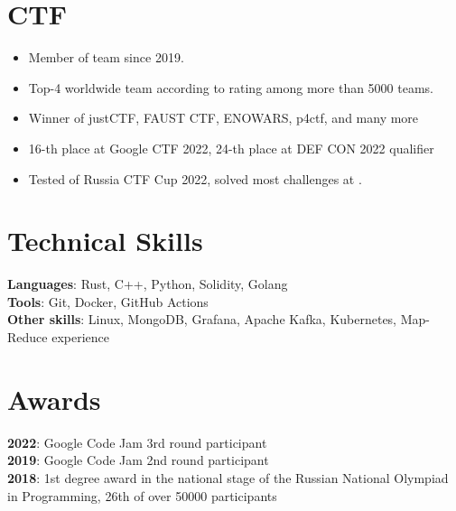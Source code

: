 \documentclass[letterpaper,11pt]{article}
\begin{document}
\section {CTF}
\begin{itemize}[leftmargin=0.15in]
  \setlength\itemsep{-5px}
  \item Member of \href{https://ctftime.org/team/83435}{\color{blue}{C4T BuT S4D}} team since 2019.
  \item Top-4 worldwide team according to \href{https://ctftime.org}{\color{blue}{ctftime}} rating among more than 5000 teams.
  \item Winner of justCTF, FAUST CTF, ENOWARS, p4ctf, and many more
  \item 16-th place at Google CTF 2022, 24-th place at DEF CON 2022 qualifier
  \item Tested \href{https://github.com/C4T-BuT-S4D/ctfcup-2022-stage3-part1}{\color{blue}{solidity stage}} of Russia CTF Cup 2022, solved most challenges at \href{https://capturetheether.com/challenges/}{\color{blue}{Capture the Ether}}.
\end{itemize}

\section{Technical Skills}
 \begin{itemize}[leftmargin=0.15in, label={}]
    \small{\item{
     \textbf{Languages}{: Rust, C++, Python, Solidity, Golang} \\
     \textbf{Tools}{: Git, Docker, GitHub Actions} \\
     \textbf{Other skills}{: Linux, MongoDB, Grafana, Apache Kafka, Kubernetes, Map-Reduce experience}
    }}
 \end{itemize}

\section{Awards}
 \begin{itemize}[leftmargin=0.15in, label={}]
    \small{\item{
    \textbf{2022}{: Google Code Jam 3rd round participant} \\
    \textbf{2019}{: Google Code Jam 2nd round participant} \\
    \textbf{2018}{: 1st degree award in the national stage of the Russian National Olympiad in Programming, 26th of over 50000 participants} \\
    }}
 \end{itemize}


\end{document}
